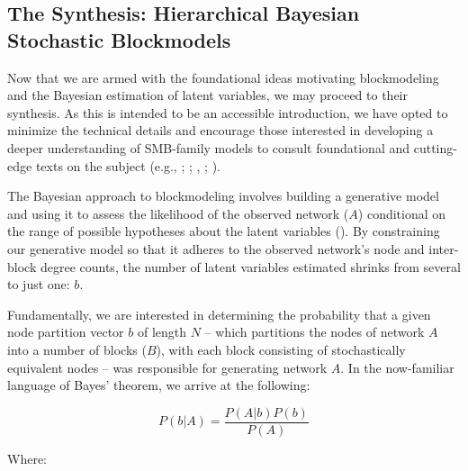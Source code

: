 \documentclass[
  12pt,
  a4paper,
  DIV=11,
  numbers=noendperiod,
  twoside,
  open=any]{scrartcl}
\begin{document}
\subsection{The Synthesis: Hierarchical Bayesian Stochastic
Blockmodels}\label{the-synthesis-hierarchical-bayesian-stochastic-blockmodels}

Now that we are armed with the foundational ideas motivating
blockmodeling and the Bayesian estimation of latent variables, we may
proceed to their synthesis. As this is intended to be an accessible
introduction, we have opted to minimize the technical details and
encourage those interested in developing a deeper understanding of
SMB-family models to consult foundational and cutting-edge texts on the
subject (e.g., ; ; ,
;
).

The Bayesian approach to blockmodeling involves building a generative
model and using it to assess the likelihood of the observed network
(\(A\)) conditional on the range of possible hypotheses about the latent
variables (). By
constraining our generative model so that it adheres to the observed
network's node and inter-block degree counts, the number of latent
variables estimated shrinks from several to just one: \(b\).

Fundamentally, we are interested in determining the probability that a
given node partition vector \(b\) of length \(N\) -- which partitions
the nodes of network \(A\) into a number of blocks (\(B\)), with each
block consisting of stochastically equivalent nodes -- was responsible
for generating network \(A\). In the now-familiar language of Bayes'
theorem, we arrive at the following:

\[
P(b|A) = \frac{P(A|b)P(b)}{P(A)} 
\]

Where:
\end{document}
